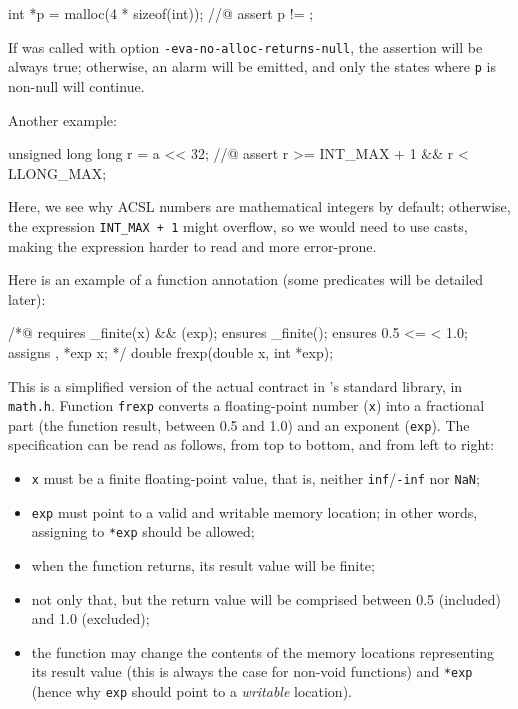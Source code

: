 \documentclass{frama-c-book}
\begin{document}
\begin{listing-nonumber}
int *p = malloc(4 * sizeof(int));
//@ assert p != \null;
\end{listing-nonumber}

If \Eva{} was called with option \texttt{-eva-no-alloc-returns-null},
the assertion will be always true; otherwise, an alarm will be emitted,
and only the states where \texttt{p} is non-null will continue.

Another example:

\begin{listing-nonumber}
unsigned long long r = a << 32;
//@ assert r >= INT_MAX + 1 && r < LLONG_MAX;
\end{listing-nonumber}

Here, we see why ACSL numbers are mathematical integers by default; otherwise,
the expression \texttt{INT\_MAX + 1} might overflow, so we would need to use
casts, making the expression harder to read and more error-prone.

Here is an example of a function annotation (some predicates will be detailed
later):

\begin{listing-nonumber}
/*@
  requires \is_finite(x) && \valid(exp);
  ensures \is_finite(\result);
  ensures 0.5 <= \result < 1.0;
  assigns \result, *exp \from x;
 */
double frexp(double x, int *exp);
\end{listing-nonumber}

This is a simplified version of the actual contract in \FramaC's standard
library, in \texttt{math.h}. Function \texttt{frexp} converts a floating-point
number (\texttt{x}) into a fractional part (the function result, between
0.5 and 1.0) and an exponent (\texttt{exp}).
The specification can be read as follows, from top to bottom, and from left
to right:
\begin{itemize}
\item \texttt{x} must be a finite floating-point value, that is, neither
  \texttt{inf}/\texttt{-inf} nor \texttt{NaN};
\item \texttt{exp} must point to a valid and writable memory location;
  in other words, assigning to \texttt{*exp} should be allowed;
\item when the function returns, its result value will be finite;
\item not only that, but the return value will be comprised between
  0.5 (included) and 1.0 (excluded);
\item the function may change the contents of the memory locations representing
  its result value (this is always the case for non-void functions) and
  \texttt{*exp} (hence why \texttt{exp} should point to a {\em writable}
  location).
\end{itemize}
\end{document}
